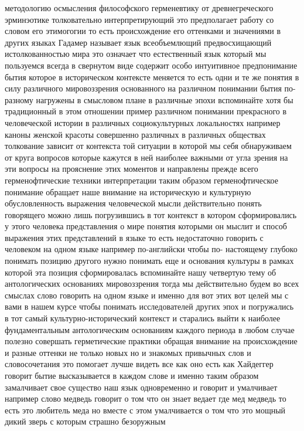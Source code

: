 методологию осмысления философского герменевтику от древнегреческого эрминэотике
толковательно интерпретирующий это предполагает работу со словом его этимогогии
то есть происхождение его оттенками и значениями в других языках Гадамер
называет язык всеобъемлющий предвосхищающий истолкованностью мира это означает
что естественный язык который мы пользуемся всегда в свернутом виде содержит
особо интуитивное предпонимание бытия которое в историческом контексте меняется
то есть одни и те же понятия в силу различного мировоззрения основанного на
различном понимании бытия по-разному нагружены в смысловом плане в различные
эпохи вспоминайте хотя бы традиционный в этом отношении пример различном
понимании прекрасного в человеческой истории в различных социокультурных
локальностях например каноны женской красоты совершенно различных в различных
обществах толкование зависит от контекста той ситуации в которой мы себя
обнаруживаем от круга вопросов которые кажутся в ней наиболее важными от угла
зрения на эти вопросы на прояснение этих моментов и направлены прежде всего
герменофтические техники интерпретации таким образом герменофтическое понимание
обращает наше внимание на историческую и культурную обусловленность выражения
человеческой мысли действительно понять говорящего можно лишь погрузившись в тот
контекст в котором сформировались у этого человека представления о мире понятия
которыми он мыслит и способ выражения этих представлений в языке то есть
недостаточно говорить с человеком на одном языке например по-английски чтобы по-
настоящему глубоко понимать позицию другого нужно понимать еще и основания
культуры в рамках которой эта позиция сформировалась вспоминайте нашу четвертую
тему об антологических основаниях мировоззрения тогда мы действительно будем во
всех смыслах слово говорить на одном языке и именно для вот этих вот целей мы с
вами в нашем курсе чтобы понимать исследователей других эпох и погружались в тот
самый культурно-исторический контекст и старались выйти к наиболее
фундаментальным антологическим основаниям каждого периода в любом случае полезно
совершать герметические практики обращая внимание на происхождение и разные
оттенки не только новых но и знакомых привычных слов и словосочетания это
помогает лучше видеть все как оно есть как Хайдеггер говорит бытие высказывается
в каждом слове и именно таким образом замалчивает свое существо наш язык
одновременно и говорит и умалчивает например слово медведь говорит о том что он
знает ведает где мед медведь то есть это любитель меда но вместе с этом
умалчивается о том что это мощный дикий зверь с которым страшно безоружным
